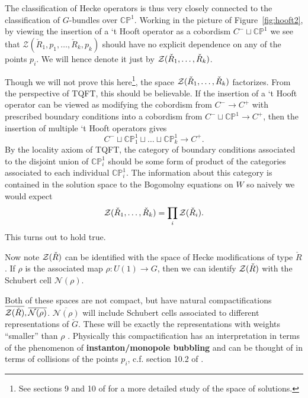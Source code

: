 	The classification of Hecke operators is thus very closely connected to the classification of $G$-bundles over $\mathbb{CP}^1$. 
	Working in the picture of Figure~\ref{fig:hooft2}, by viewing the insertion of a `t Hooft operator as a cobordism $C^- \sqcup \mathbb{CP}^1$ we see that $\mathcal Z(\check R_1, p_1, \dots, \check R_k, p_k)$ should have no explicit dependence on any of the points $p_i$. We will hence denote it just by $\mathcal{Z}(\check R_1, \dots, \check R_k)$.
	
	Though we will not prove this here\footnote{See sections 9 and 10 of \cite{kapustin2006} for a more detailed study of the space of solutions.}, the space $\mathcal{Z}(\check R_1, \dots, \check R_k)$ factorizes. From the perspective of TQFT, this should be believable. If the insertion of a `t Hooft operator can be viewed as modifying the cobordism from $C^- \to C^+$ with prescribed boundary conditions into a cobordism from $C^- \sqcup \mathbb{CP}^1 \to C^+$, then the insertion of multiple `t Hooft operators gives
	\[
		C^- \sqcup \mathbb{CP}^1_1 \sqcup \dots \sqcup \mathbb{CP}^1_k \to C^+.
	\]
	By the locality axiom of TQFT, the category of boundary conditions associated to the disjoint union of $\mathbb{CP}^1_i$ should be some form of product of the categories associated to each individual $\mathbb{CP}^1_i$. The information about this category is contained in the solution space to the Bogomolny equations on $W$ so naively we would expect 
	\[
		\mathcal{Z}(\check R_1, \dots, \check R_k) = \prod_{i} \mathcal{Z}(\check R_i).
	\]
	This turns out to hold true.
	
	Now note
		$\mathcal{Z}(\check R)$ can be identified with the space of Hecke modifications of type $\check R$. If $\rho$ is the associated map $\rho: U(1) \to G$, then we can identify $\mathcal{Z}(\check R)$ with the Schubert cell $\mathcal N(\rho)$. 
	
	Both of these spaces are not compact, but have natural compactifications $\overline{\mathcal{Z}(\check R)}, \overline{\mathcal N(\rho)}$. $\overline {\mathcal N(\rho)}$ will include Schubert cells associated to different representations of $\check G$. These will be exactly the representations with weights ``smaller'' than $\rho$ \cite{witten2010}. Physically this compactification has an interpretation in terms of the phenomenon of \textbf{instanton/monopole bubbling} and can be thought of in terms of collisions of the points $p_i$, c.f. section 10.2 of \cite{kapustin2006}.
	
